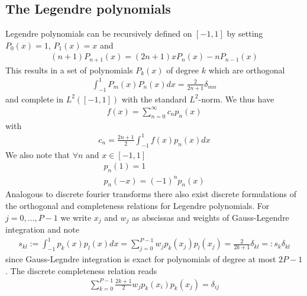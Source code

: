 \documentclass[a4paper,12pt]{scrartcl}
\begin{document}
\subsection{ The Legendre polynomials}
Legendre polynomials can be recursively defined on $[-1,1]$ by setting
$P_0(x) = 1$, $P_1(x) = x$ and
\begin{align}
    (n+1)P_{n+1}(x) = (2n+1)xP_n(x) - nP_{n-1}(x)
    \label{eq:recursion}
\end{align}
This results in a set of polynomials $P_k(x)$ of degree $k$ which are orthogonal
\begin{align}
    \int_{-1}^{1} P_m(x)P_n(x) dx = \frac{2}{2n+1}\delta_{mn} 
    \label{eq:orthogonal}
\end{align}
and complete in $L^2([-1,1])$ with the standard $L^2$-norm. We thus have
\begin{align}
    f(x) = \sum_{n=0}^\infty c_n p_n(x)
    \label{eq:expansion}
\end{align} with
\begin{align}
    c_n = \frac{2n+1}{2}\int_{-1}^{1} f(x)p_n(x)dx
    \label{eq:coefficient}
\end{align}
We also note that $\forall n$ and $x\in[-1,1]$
\begin{subequations}
\begin{align}
    p_n(1) = 1 \\
    p_n(-x) = (-1)^np_n(x)
\end{align}
\label{eq:boundaries}
\end{subequations}
Analogous to discrete fourier transforms there also exist discrete formulations
of the orthogonal and completeness relations for Legendre polynomials.
For $j=0,\dots,P-1$ we write $x_j$ and $w_j$ as abscissas and weights of 
Gauss-Legendre integration and note
\begin{align}
    s_{kl} := \int_{-1}^1 p_k(x)p_l(x) dx = \sum_{j=0}^{P-1} w_jp_k (x_j)p_l(x_j) = \frac{2}{2k+1}\delta_{kl} =: s_k \delta_{kl}
    \label{}
\end{align}
since Gauss-Legndre integration is exact for polynomials of degree at most $2P-1$.
The discrete completeness relation reads
\begin{align}
    \sum_{k=0}^{P-1} \frac{2k+1}{2}w_j p_k(x_i)p_k(x_j) = \delta_{ij} 
    \label{}
\end{align}
\end{document}
